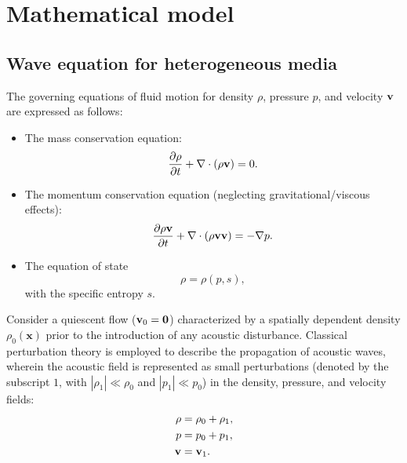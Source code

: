 \documentclass[final,num,12pt]{elsarticle}
\renewcommand{\v}{\TextOrMath{\textv}{\mathbf{v}}}
\newcommand{\x}{\mathbf{x}}
\begin{document}
\section{Mathematical model}
\label{sec:model}

\subsection{Wave equation for heterogeneous media}
The governing equations of fluid motion for density $\rho$, pressure $p$, and velocity $\v$ are expressed as follows:
\begin{itemize}
\item The mass conservation equation:
        \begin{equation}
            \frac{\partial \rho}{\partial t} + \nabla\cdot(\rho \v)=0.
            \label{eq:massConserv}
        \end{equation}
        \item The momentum conservation equation (neglecting gravitational/viscous effects):
        \begin{equation}
            \frac{\partial \rho \v}{\partial t} + \nabla\cdot(\rho \v\v)=-\nabla p.
            \label{eq:momConserv}    
        \end{equation}
        \item The equation of state
        \begin{equation}
            \rho  =\rho(p,s),
        \end{equation}
        with the specific entropy $s$.
\end{itemize}  
   
Consider a quiescent flow ($\v_0=\mathbf{0}$) characterized by a spatially dependent density $\rho_0(\x)$ prior to the introduction of any acoustic disturbance. Classical perturbation theory is employed to describe the propagation of acoustic waves, wherein the acoustic field is represented as small perturbations (denoted by the subscript $1$, with $|\rho_1|\ll \rho_0$ and $|p_1|\ll p_0$) in the density, pressure, and velocity fields:
    \begin{equation}
        \begin{aligned}
            \rho &= \rho_0 + \rho_1, \\
            p &= p_0 + p_1, \\
            \v &= \v_1.
            \label{eq:1stPert}
        \end{aligned}
    \end{equation}
\end{document}
